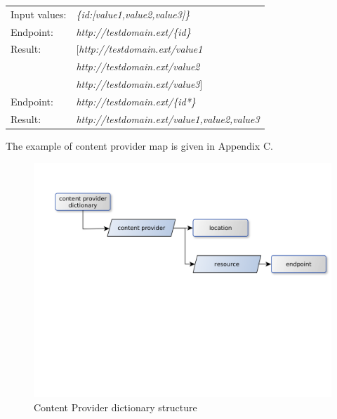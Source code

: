 
\begin{center}
  \begin{tabular}{l l}
    Input values: & \textit{\{id:[value1,value2,value3]\}} \\
    Endpoint: & \textit{http://testdomain.ext/\{id\}}  \\ 
    Result: & [\textit{http://testdomain.ext/value1}   \\
    		&  \textit{http://testdomain.ext/value2}   \\
    		&  \textit{http://testdomain.ext/value3}]  \\
    Endpoint: & \textit{http://testdomain.ext/\{id*\}} \\
    Result: &  \textit{http://testdomain.ext/value1,value2,value3}
  \end{tabular}
\end{center}

The example of content provider map is given in Appendix C.


\begin{figure}[h]
    \centering
	\includegraphics[width=\textwidth]{images/content_provider_map.png}
    \caption{Content Provider dictionary structure}
    \label{fig:content_provider_map}
\end{figure}


